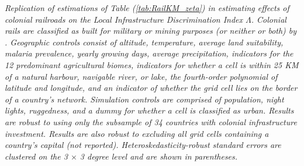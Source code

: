 \documentclass[11pt, oneside]{article}   	%
\let\oldref\ref
\renewcommand{\ref}[1]{(\oldref{#1})}
\newcommand{\mysubcaption}[1]{
\justify
\begin{spacing}{0.7}
\textit{\footnotesize #1}
\end{spacing}}
\begin{document}
\begin{table}[!ph]
\mysubcaption{Replication of estimations of Table \ref{tab:RailKM_zeta} in estimating effects of colonial railroads on the Local Infrastructure Discrimination Index $\Lambda$. Colonial rails are classified as built for military or mining purposes (or neither or both) by \cite{Jedwab_PermanentEffectsTransportation_2016a}. Geographic controls consist of altitude, temperature, average land suitability, malaria prevalence, yearly growing days, average precipitation, indicators for the 12 predominant agricultural biomes, indicators for whether a cell is within 25 KM of a natural harbour, navigable river, or lake, the fourth-order polynomial of latitude and longitude, and an indicator of whether the grid cell lies on the border of a country's network. Simulation controls are comprised of population, night lights, ruggedness, and a dummy for whether a cell is classified as urban. Results are robust to using only the subsample of 34 countries with colonial infrastructure investment. Results are also robust to excluding all grid cells containing a country's capital (not reported). Heteroskedasticity-robust standard errors are clustered on the 3 $\times$ 3 degree level and are shown in parentheses.}
\end{table}
\end{document}
